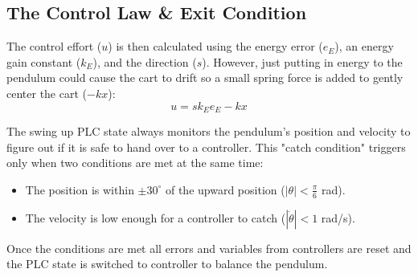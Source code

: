 \subsection{The Control Law \& Exit Condition}
The control effort ($u$) is then calculated using the energy error ($e_E$), an energy gain constant ($k_{E}$), and the direction ($s$). However, just putting in energy to the pendulum could cause the cart to drift so a small spring force is added to gently center the cart ($-k x$):
\begin{equation}
	\label{Energy control law}
	u = s k_{E} e_E - k x
\end{equation}

The swing up PLC state always monitors the pendulum's position and velocity to figure out if it is safe to hand over to a controller. This "catch condition" triggers only when two conditions are met at the same time:

\begin{itemize}
\label{Swing exit condition}
\item The position is within $\pm 30^\circ$ of the upward position ($|{\theta}| < \frac{\pi}{6}$ rad).
\item The velocity is low enough for a controller to catch ($|\dot{\theta}| < 1$ rad/s).
\end{itemize}

Once the conditions are met all errors and variables from controllers are reset and the PLC state is switched to controller to balance the pendulum.

